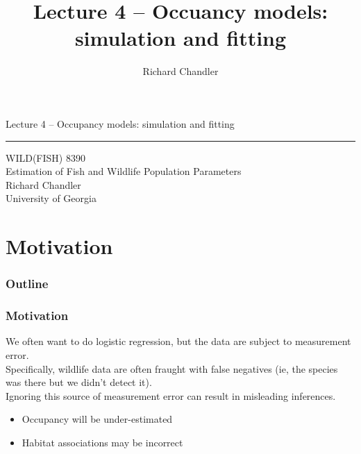 \documentclass[color=usenames,dvipsnames]{beamer}\usepackage[]{graphicx}\usepackage[]{color}
\title{Lecture 4 -- Occuancy models: simulation and fitting }
\author{Richard Chandler}
\begin{document}
\begin{frame}[plain]
  \LARGE
  \centering
  {\huge Lecture 4 -- Occupancy models: simulation and fitting} \\
  {\color{default} \rule{\textwidth}{0.1pt}}
  \vfill
  \large
  WILD(FISH) 8390 \\
  Estimation of Fish and Wildlife Population Parameters \\
  \vfill
  \large
  Richard Chandler \\
  University of Georgia \\
\end{frame}






\section{Motivation}



\begin{frame}[plain]
  \frametitle{Outline}
  \Large
\end{frame}



\begin{frame}
  \frametitle{Motivation}
  We often want to do logistic regression, but the data are subject
  to measurement error. \\  
  \pause
  \vfill
  Specifically, wildlife data are often fraught with false negatives
  (ie, the species was there but we didn't detect it). \\
  \pause
  \vfill
  Ignoring this source of measurement error can result in misleading
  inferences. \\
  \begin{itemize}
    \item Occupancy will be under-estimated
    \item Habitat associations may be incorrect
  \end{itemize}
\end{frame}


\end{document}

